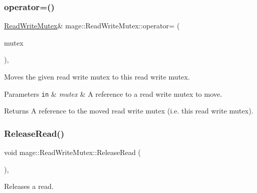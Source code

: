 \subsubsection{\texorpdfstring{operator=()}{operator=()}\hspace{0.1cm}{\footnotesize\ttfamily [2/2]}}
{\footnotesize\ttfamily \hyperlink{classmage_1_1_read_write_mutex}{Read\+Write\+Mutex}\& mage\+::\+Read\+Write\+Mutex\+::operator= (\begin{DoxyParamCaption}\item[{\hyperlink{classmage_1_1_read_write_mutex}{Read\+Write\+Mutex} \&\&}]{mutex }\end{DoxyParamCaption})\hspace{0.3cm}{\ttfamily [default]}, {\ttfamily [noexcept]}}

Moves the given read write mutex to this read write mutex.


\begin{DoxyParams}[1]{Parameters}
\mbox{\tt in}  & {\em mutex} & A reference to a read write mutex to move. \\
\hline
\end{DoxyParams}
\begin{DoxyReturn}{Returns}
A reference to the moved read write mutex (i.\+e. this read write mutex). 
\end{DoxyReturn}
\hypertarget{classmage_1_1_read_write_mutex_a4fbd8ad3d47e07307c31a4e212305744}{}\label{classmage_1_1_read_write_mutex_a4fbd8ad3d47e07307c31a4e212305744} 
\subsubsection{\texorpdfstring{Release\+Read()}{ReleaseRead()}}
{\footnotesize\ttfamily void mage\+::\+Read\+Write\+Mutex\+::\+Release\+Read (\begin{DoxyParamCaption}{ }\end{DoxyParamCaption})\hspace{0.3cm}{\ttfamily [private]}, {\ttfamily [noexcept]}}

Releases a read. \hypertarget{classmage_1_1_read_write_mutex_ad520a65bee5a8ac04671ee93895d9b28}{}\label{classmage_1_1_read_write_mutex_ad520a65bee5a8ac04671ee93895d9b28} 
